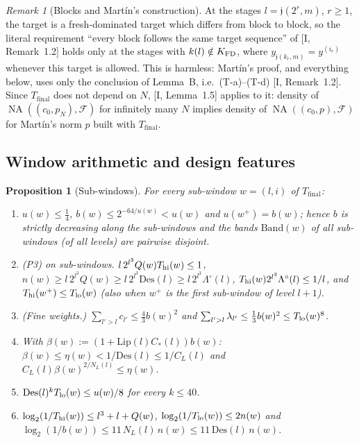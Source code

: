 \documentclass[10pt]{amsart}
\newtheorem{proposition}[theorem]{Proposition}
\theoremstyle{definition}
\theoremstyle{remark}
\newtheorem{remark}[theorem]{Remark}
\newcommand{\NA}{\operatorname{NA}}
\begin{document}
\begin{remark}[Blocks and Mart\'in's construction]\label{rem:II-blocks}
At the stages $l=\mathfrak j(2^r,m)$, $r\ge1$, the target is a
fresh-dominated target which differs from block to block, so the
literal requirement ``every block follows the same target sequence'' of
[I, Remark~1.2] holds only at the stages with $k(l)\notin K_{\rm
FD}$, where $y_{\mathfrak j(k_r,m)}=y^{(i_r)}$ whenever this target is
allowed.  This is harmless: Mart\'in's proof, and everything below, uses
only the conclusion of Lemma~B, i.e.\ (T-a)--(T-d)
[I, Remark~1.2].  Since $T_{\mathrm{final}}$ does not depend on
$N$, [I, Lemma~1.5] applies to it: density of
$\NA((c_0,p_N),\mathcal F)$ for infinitely many $N$ implies density of
$\NA((c_0,p),\mathcal F)$ for Mart\'in's norm $p$ built with
$T_{\mathrm{final}}$.
\end{remark}

\subsection{Window arithmetic and design features}

\begin{proposition}[Sub-windows]\label{prop:II-subwindows}
For every sub-window $w=(l,i)$ of $T_{\mathrm{final}}$:
\begin{enumerate}
\item[(a)] $u(w)\le\frac14$, $b(w)\le2^{-64/u(w)}<u(w)$ and
$u(w^+)=b(w)$; hence $b$ is strictly decreasing along the sub-windows and
the bands $\mathrm{Band}(w)$ of all sub-windows (of all levels) are
pairwise disjoint.
\item[(b)] \textup{(P3) on sub-windows.}  $l\,2^{l^3}Q(w)T_{\rm hi}(w)\le1$,
$n(w)\ge l\,2^{l^3}Q(w)\ge l\,2^{l^3}\mathrm{Des}(l)\ge l\,2^{l^3}
\Lambda^\circ(l)$, $T_{\rm hi}(w)2^{l^3}\Lambda^\circ(l)\le1/l$, and
$T_{\rm hi}(w^+)\le T_{\rm lo}(w)$ \textup{(}also when $w^+$ is the first
sub-window of level $l+1$\textup{)}.
\item[(c)] \textup{(Fine weights.)}  $\sum_{l'>l}c_{l'}\le\frac43b(w)^2$
and $\sum_{l'>l}\lambda_{l'}\le\frac13b(w)^2\le T_{\rm lo}(w)^8$.
\item[(d)] With $\beta(w):=(1+\mathrm{Lip}(l)C_*(l))b(w)$:
$\beta(w)\le\eta(w)<1/\mathrm{Des}(l)\le1/C_L(l)$ and
$C_L(l)\beta(w)^{2/N_L(l)}\le\eta(w)$.
\item[(e)] $\mathrm{Des}(l)^kT_{\rm lo}(w)\le u(w)/8$ for every $k\le40$.
\item[(f)] $\log_2(1/T_{\rm hi}(w))\le l^3+l+Q(w)$,
$\log_2(1/T_{\rm lo}(w))\le2n(w)$ and
$\log_2(1/b(w))\le11\,N_L(l)\,n(w)\le11\,\mathrm{Des}(l)\,n(w)$.
\end{enumerate}
\end{proposition}
\end{document}
